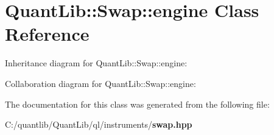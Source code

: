 \section{Quant\+Lib\+:\+:Swap\+:\+:engine Class Reference}
\label{class_quant_lib_1_1_swap_1_1engine}


Inheritance diagram for Quant\+Lib\+:\+:Swap\+:\+:engine\+:


Collaboration diagram for Quant\+Lib\+:\+:Swap\+:\+:engine\+:


The documentation for this class was generated from the following file\+:\begin{DoxyCompactItemize}
\item 
C\+:/quantlib/\+Quant\+Lib/ql/instruments/{\bf swap.\+hpp}\end{DoxyCompactItemize}
